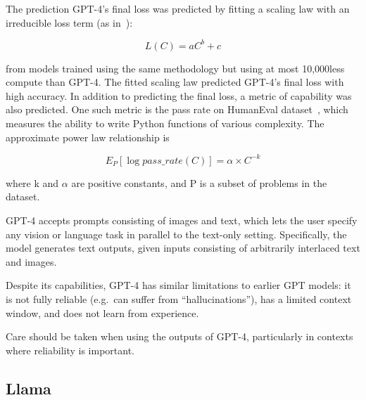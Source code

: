 The prediction GPT-4's final loss was predicted by fitting a scaling law with an irreducible loss term (as in~\textcite{henighan2020scaling}):

\begin{equation}
	L(C) = aC^b + c
	\label{eq:gpt4-scaling-law}
\end{equation}

\noindent from models trained using the same methodology but using at most 10,000\texttimes less compute than GPT-4.
The fitted scaling law predicted GPT-4's final loss with high accuracy.
In addition to predicting the final loss, a metric of capability was also predicted.
One such metric is the pass rate on HumanEval dataset~\cite{chen2021evaluating}, which measures the ability to write Python functions of various complexity.
The approximate power law relationship is

\begin{equation}
	E_P [\log{pass\_rate(C)}] = \alpha \times C^{-k}
	\label{eq:gpt4-pass-rate}
\end{equation}

\noindent where k and \(\alpha\) are positive constants, and P is a subset of problems in the dataset.

GPT-4 accepts prompts consisting of images and text, which lets the user specify any vision or language task in parallel to the text-only setting.
Specifically, the model generates text outputs, given inputs consisting of arbitrarily interlaced text and images.

Despite its capabilities, GPT-4 has similar limitations to earlier GPT models: it is not fully reliable (e.g.\ can suffer from \enquote{hallucinations}), has a limited context window, and does not learn from experience.

Care should be taken when using the outputs of GPT-4, particularly in contexts where reliability is important.

\subsection{Llama}
\label{subsec:llama}

